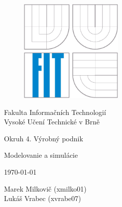 \documentclass[12pt,a4paper,titlepage,final]{article}
\begin{document}

\def\projname{Okruh 4. Výrobný podnik}


\begin{titlepage}

\begin{figure}[!h]
  \centering
  \includegraphics[height=5cm]{logo.eps}
\end{figure}
\center Fakulta Informačních Technologií \\
\center Vysoké Učení Technické v Brně \\

\vfill

\begin{center}
\bigskip
\begin{Huge}
\projname\\
\end{Huge}
\begin{large}
Modelovanie a simulácie\\
\end{large}
\end{center}

\vfill

\begin{center}
\begin{Large}
\today
\end{Large}
\end{center}

\vfill

\begin{flushleft}
\begin{large}
Marek Milkovič (xmilko01)\\
Lukáš Vrabec (xvrabe07) \\
\end{large}
\end{flushleft}
\end{titlepage}

\pagestyle{plain}
\tableofcontents
\end{document}
